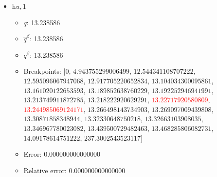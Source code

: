 \documentclass{article}%
\begin{document}
\begin{itemize}
\begin{itemize}
		\item Error: 0.000000000000000%
		\item Relative error: 0.000000000000000%
	\end{itemize}%
	\item $\textit{hu},1$%
	\begin{itemize}%
		\item $q$: 13.238586%
		\item $\hat{q}^\beta$: 13.238586%
		\item $q^\beta$: 13.238586%
		\item Breakpoints: $[$$0$, $4.943755299006499$, $12.544341108707222$, $12.595096067947068$, $12.917705220652834$, $13.104034300095861$, $13.161020122653593$, $13.189852638760229$, $13.192252946941991$, $13.213749911872785$, $13.218222920629291$, \textcolor{red}{$13.22717920580809$}, \textcolor{red}{$13.244985069124171$}, $13.266498143734903$, $13.269097009439808$, $13.30871858348944$, $13.32330648750218$, $13.32663103908035$, $13.346967780023082$, $13.439500729482463$, $13.468285806082731$, $14.09178614751222$, $237.3002543523117$$]$%
		\item Error: 0.000000000000000%
		\item Relative error: 0.000000000000000%
	\end{itemize}%
\end{itemize}%
\end{document}
